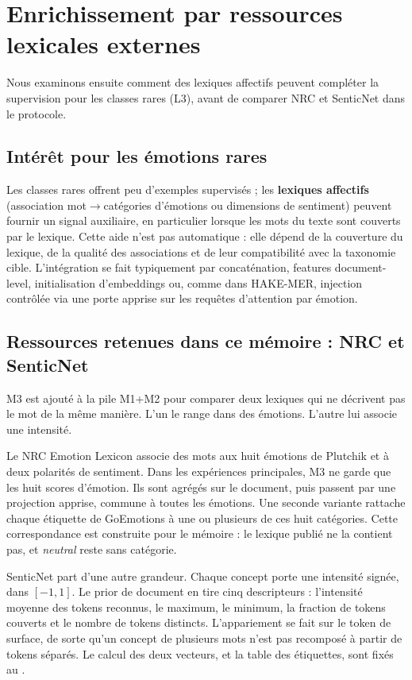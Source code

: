 \section{Enrichissement par ressources lexicales externes}
\label{sec:etat-lexiques}

Nous examinons ensuite comment des lexiques affectifs peuvent compléter
la supervision pour les classes rares (L3), avant de comparer NRC et
SenticNet dans le protocole.

\subsection{Intérêt pour les émotions rares}

Les classes rares offrent peu d'exemples supervisés ; les
\textbf{lexiques affectifs} (association mot$\to$catégories
d'émotions ou dimensions de sentiment) peuvent fournir un signal
auxiliaire, en particulier lorsque les mots du texte sont couverts
par le lexique. Cette aide n'est pas automatique : elle dépend de la
couverture du lexique, de la qualité des associations et de leur
compatibilité avec la taxonomie cible. L'intégration se fait typiquement par
concaténation, features document-level, initialisation d'embeddings
ou, comme dans HAKE-MER, injection contrôlée via une porte
apprise sur les requêtes d'attention par émotion.

\subsection{Ressources retenues dans ce mémoire : NRC et SenticNet}

M3 est ajouté à la pile M1+M2 pour comparer deux lexiques qui ne
décrivent pas le mot de la même manière. L'un le range dans des
émotions. L'autre lui associe une intensité.

Le NRC Emotion Lexicon \cite{mohammad2013} associe des mots aux huit
émotions de Plutchik et à deux polarités de sentiment. Dans les
expériences principales, M3 ne garde que les huit scores d'émotion.
Ils sont agrégés sur le document, puis passent par une projection
apprise, commune à toutes les émotions. Une seconde variante rattache
chaque étiquette de GoEmotions à une ou plusieurs de ces huit
catégories. Cette correspondance est construite pour le mémoire : le
lexique publié ne la contient pas, et \emph{neutral} reste sans
catégorie.

SenticNet \cite{cambria2018senticnet} part d'une autre grandeur. Chaque
concept porte une intensité signée, dans $[-1, 1]$. Le prior de
document en tire cinq descripteurs : l'intensité moyenne des tokens
reconnus, le maximum, le minimum, la fraction de tokens couverts et le
nombre de tokens distincts. L'appariement se fait sur le token de
surface, de sorte qu'un concept de plusieurs mots n'est pas recomposé
à partir de tokens séparés. Le calcul des deux vecteurs, et la table
des étiquettes, sont fixés au .

